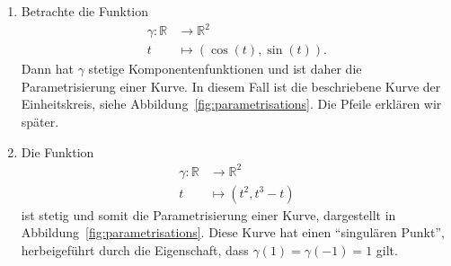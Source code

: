 \documentclass[../main.tex]{subfiles}
\begin{document}
\begin{example}
  \leavevmode
  \begin{enumerate}[(1)]
    \item 
      Betrachte die Funktion
      \begin{align*}
        \gamma \colon \mathbb{R} & \to \mathbb{R}^2 \\
        t & \mapsto (\cos(t), \sin(t)).
      \end{align*}
      Dann hat $\gamma$ stetige
      Komponentenfunktionen und ist
      daher die Parametrisierung einer Kurve.
      In diesem Fall ist die beschriebene Kurve
      der Einheitskreis, siehe Abbildung~\ref{fig:parametrisations}.
      Die Pfeile erklären wir später.
    \item Die Funktion
      \begin{align*}
        \gamma \colon \mathbb{R} & \to \mathbb{R}^2 \\
        t & \mapsto (t^2, t^3 - t)
      \end{align*}
      ist stetig und somit die Parametrisierung einer Kurve,
      dargestellt in Abbildung~\ref{fig:parametrisations}.
      Diese Kurve hat einen ``singulären Punkt'',
      herbeigeführt durch die Eigenschaft,
      dass $\gamma(1) = \gamma(-1) = 1$ gilt.
  \end{enumerate}
\end{example}
\end{document}
